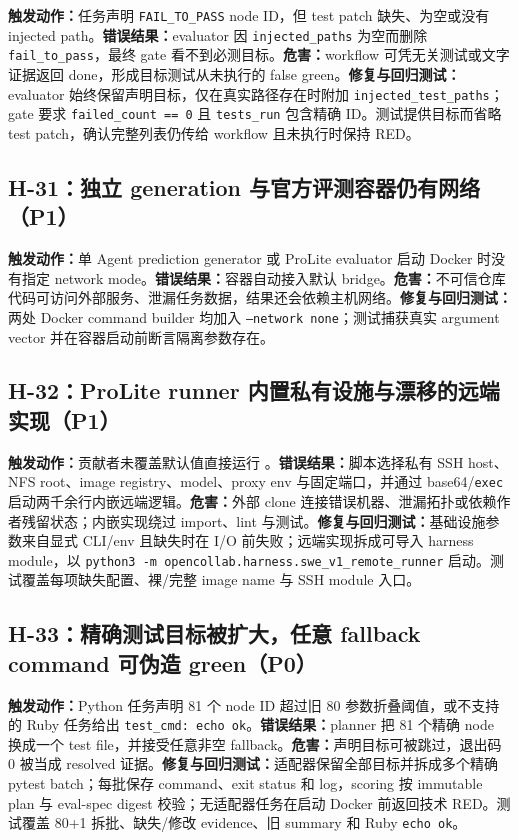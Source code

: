 \documentclass[11pt,a4paper,fontset=fandol]{ctexart}
\newcommand{\code}[1]{\texttt{#1}}
\begin{document}
\textbf{触发动作：}任务声明 \code{FAIL\_TO\_PASS} node ID，但 test patch 缺失、为空或没有 injected path。\textbf{错误结果：}evaluator 因 \code{injected\_paths} 为空而删除 \code{fail\_to\_pass}，最终 gate 看不到必测目标。\textbf{危害：}workflow 可凭无关测试或文字证据返回 done，形成目标测试从未执行的 false green。\textbf{修复与回归测试：}evaluator 始终保留声明目标，仅在真实路径存在时附加 \code{injected\_test\_paths}；gate 要求 \code{failed\_count == 0} 且 \code{tests\_run} 包含精确 ID。测试提供目标而省略 test patch，确认完整列表仍传给 workflow 且未执行时保持 RED。

\subsection{H-31：独立 generation 与官方评测容器仍有网络（P1）}

\textbf{触发动作：}单 Agent prediction generator 或 ProLite evaluator 启动 Docker 时没有指定 network mode。\textbf{错误结果：}容器自动接入默认 bridge。\textbf{危害：}不可信仓库代码可访问外部服务、泄漏任务数据，结果还会依赖主机网络。\textbf{修复与回归测试：}两处 Docker command builder 均加入 \code{--network none}；测试捕获真实 argument vector 并在容器启动前断言隔离参数存在。

\subsection{H-32：ProLite runner 内置私有设施与漂移的远端实现（P1）}

\textbf{触发动作：}贡献者未覆盖默认值直接运行 。\textbf{错误结果：}脚本选择私有 SSH host、NFS root、image registry、model、proxy env 与固定端口，并通过 base64/\code{exec} 启动两千余行内嵌远端逻辑。\textbf{危害：}外部 clone 连接错误机器、泄漏拓扑或依赖作者残留状态；内嵌实现绕过 import、lint 与测试。\textbf{修复与回归测试：}基础设施参数来自显式 CLI/env 且缺失时在 I/O 前失败；远端实现拆成可导入 harness module，以 \code{python3 -m opencollab.harness.swe\_v1\_remote\_runner} 启动。测试覆盖每项缺失配置、裸/完整 image name 与 SSH module 入口。

\subsection{H-33：精确测试目标被扩大，任意 fallback command 可伪造 green（P0）}

\textbf{触发动作：}Python 任务声明 81 个 node ID 超过旧 80 参数折叠阈值，或不支持的 Ruby 任务给出 \code{test\_cmd: echo ok}。\textbf{错误结果：}planner 把 81 个精确 node 换成一个 test file，并接受任意非空 fallback。\textbf{危害：}声明目标可被跳过，退出码 0 被当成 resolved 证据。\textbf{修复与回归测试：}适配器保留全部目标并拆成多个精确 pytest batch；每批保存 command、exit status 和 log，scoring 按 immutable plan 与 eval-spec digest 校验；无适配器任务在启动 Docker 前返回技术 RED。测试覆盖 80+1 拆批、缺失/修改 evidence、旧 summary 和 Ruby \code{echo ok}。
\end{document}
